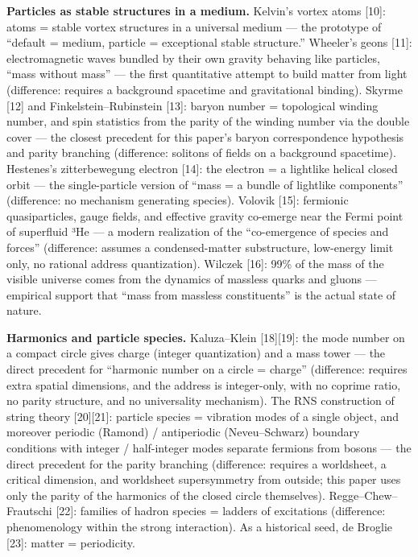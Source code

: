 \documentclass[
  a4paper,
]{article}
\begin{document}
\textbf{Particles as stable structures in a medium.} Kelvin's vortex
atoms {[}10{]}: atoms = stable vortex structures in a universal medium
--- the prototype of ``default = medium, particle = exceptional stable
structure.'' Wheeler's geons {[}11{]}: electromagnetic waves bundled by
their own gravity behaving like particles, ``mass without mass'' --- the
first quantitative attempt to build matter from light (difference:
requires a background spacetime and gravitational binding). Skyrme
{[}12{]} and Finkelstein--Rubinstein {[}13{]}: baryon number =
topological winding number, and spin statistics from the parity of the
winding number via the double cover --- the closest precedent for this
paper's baryon correspondence hypothesis and parity branching
(difference: solitons of fields on a background spacetime). Hestenes's
zitterbewegung electron {[}14{]}: the electron = a lightlike helical
closed orbit --- the single-particle version of ``mass = a bundle of
lightlike components'' (difference: no mechanism generating species).
Volovik {[}15{]}: fermionic quasiparticles, gauge fields, and effective
gravity co-emerge near the Fermi point of superfluid ³He --- a modern
realization of the ``co-emergence of species and forces'' (difference:
assumes a condensed-matter substructure, low-energy limit only, no
rational address quantization). Wilczek {[}16{]}: 99\% of the mass of
the visible universe comes from the dynamics of massless quarks and
gluons --- empirical support that ``mass from massless constituents'' is
the actual state of nature.

\textbf{Harmonics and particle species.} Kaluza--Klein {[}18{]}{[}19{]}:
the mode number on a compact circle gives charge (integer quantization)
and a mass tower --- the direct precedent for ``harmonic number on a
circle = charge'' (difference: requires extra spatial dimensions, and
the address is integer-only, with no coprime ratio, no parity structure,
and no universality mechanism). The RNS construction of string theory
{[}20{]}{[}21{]}: particle species = vibration modes of a single object,
and moreover periodic (Ramond) / antiperiodic (Neveu--Schwarz) boundary
conditions with integer / half-integer modes separate fermions from
bosons --- the direct precedent for the parity branching (difference:
requires a worldsheet, a critical dimension, and worldsheet
supersymmetry from outside; this paper uses only the parity of the
harmonics of the closed circle themselves). Regge--Chew--Frautschi
{[}22{]}: families of hadron species = ladders of excitations
(difference: phenomenology within the strong interaction). As a
historical seed, de Broglie {[}23{]}: matter = periodicity.
\end{document}
